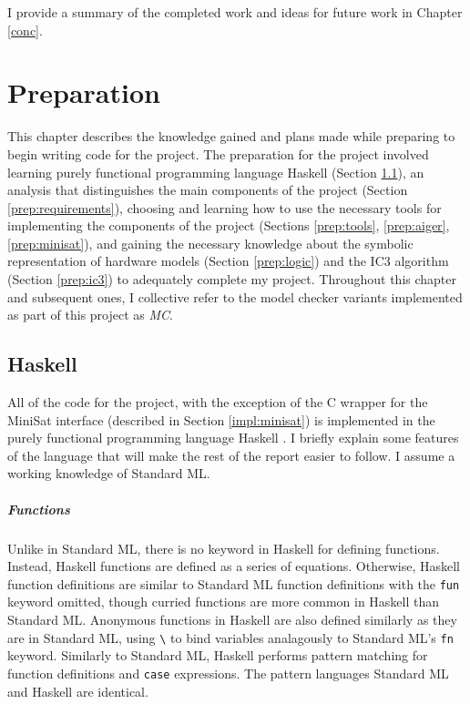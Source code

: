 \documentclass[12pt,a4paper,twoside,openright]{report}
\begin{document}
I provide a summary of the completed work and ideas for
future work in Chapter \ref{conc}.

\chapter{Preparation}
\label{prep}

This chapter describes the knowledge gained and plans made while preparing
to begin writing code for the project.
The preparation for the project involved learning purely functional
programming language Haskell (Section \ref{prep:haskell}),
an analysis that distinguishes the main components of the project
(Section \ref{prep:requirements}), choosing and learning how to use
the necessary tools for implementing the components of the project
(Sections \ref{prep:tools}, \ref{prep:aiger}, \ref{prep:minisat}),
and gaining the necessary knowledge about the symbolic representation
of hardware models
(Section \ref{prep:logic}) and the IC3 algorithm (Section \ref{prep:ic3}) to
adequately complete my project.
Throughout this chapter and subsequent ones, I collective refer to the model checker
variants implemented as part of this project as \emph{MC}.

\section{Haskell}
\label{prep:haskell}

All of the code for the project, with the exception of the C wrapper for the
MiniSat interface (described in Section \ref{impl:minisat})
is implemented in the purely functional
programming language Haskell \cite{haskell}.
I briefly explain some features of the
language that will make the rest of the report easier to follow.
I assume a working knowledge of Standard ML.

\paragraph{Functions}{
Unlike in Standard ML, there is no keyword in Haskell for defining functions. Instead,
Haskell functions are defined as a series of equations. Otherwise,
Haskell function definitions are similar to Standard ML function definitions with the
\verb,fun, keyword omitted, though curried functions are more common in Haskell than
Standard ML. Anonymous functions in Haskell are also defined similarly
as they are in Standard ML, using \verb,\, to bind variables analagously to Standard
ML's \verb,fn, keyword. Similarly to Standard ML, Haskell performs pattern matching
for function definitions and \verb,case, expressions. The pattern languages Standard
ML and Haskell are identical.
}
\end{document}
